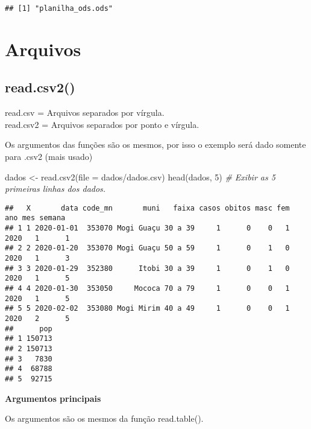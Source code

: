 \documentclass[
]{book}
\newenvironment{Shaded}{\begin{snugshade}}{\end{snugshade}}
\newcommand{\AttributeTok}[1]{\textcolor[rgb]{0.77,0.63,0.00}{#1}}
\newcommand{\CommentTok}[1]{\textcolor[rgb]{0.56,0.35,0.01}{\textit{#1}}}
\newcommand{\DecValTok}[1]{\textcolor[rgb]{0.00,0.00,0.81}{#1}}
\newcommand{\FunctionTok}[1]{\textcolor[rgb]{0.00,0.00,0.00}{#1}}
\newcommand{\NormalTok}[1]{#1}
\newcommand{\OtherTok}[1]{\textcolor[rgb]{0.56,0.35,0.01}{#1}}
\newcommand{\StringTok}[1]{\textcolor[rgb]{0.31,0.60,0.02}{#1}}
\theoremstyle{definition}
\theoremstyle{definition}
\theoremstyle{definition}
\theoremstyle{definition}
\theoremstyle{remark}
\begin{document}
\begin{verbatim}
## [1] "planilha_ods.ods"
\end{verbatim}

\hypertarget{arquivos}{%
\section{Arquivos}\label{arquivos}}

\hypertarget{read.csv2}{%
\subsection{read.csv2()}\label{read.csv2}}

read.csv = Arquivos separados por vírgula.\\
read.csv2 = Arquivos separados por ponto e vírgula.

Os argumentos das funções são os mesmos, por isso o exemplo será dado somente para .csv2 (mais usado)

\begin{Shaded}
\begin{Highlighting}[]
\NormalTok{dados }\OtherTok{\textless{}{-}} \FunctionTok{read.csv2}\NormalTok{(}\AttributeTok{file =} \StringTok{\textquotesingle{}dados/dados.csv\textquotesingle{}}\NormalTok{)}
\FunctionTok{head}\NormalTok{(dados, }\DecValTok{5}\NormalTok{)          }\CommentTok{\# Exibir as 5 primeiras linhas dos dados.}
\end{Highlighting}
\end{Shaded}

\begin{verbatim}
##   X       data code_mn       muni   faixa casos obitos masc fem  ano mes semana
## 1 1 2020-01-01  353070 Mogi Guaçu 30 a 39     1      0    0   1 2020   1      1
## 2 2 2020-01-20  353070 Mogi Guaçu 50 a 59     1      0    1   0 2020   1      3
## 3 3 2020-01-29  352380      Itobi 30 a 39     1      0    1   0 2020   1      5
## 4 4 2020-01-30  353050     Mococa 70 a 79     1      0    0   1 2020   1      5
## 5 5 2020-02-02  353080 Mogi Mirim 40 a 49     1      0    0   1 2020   2      5
##      pop
## 1 150713
## 2 150713
## 3   7830
## 4  68788
## 5  92715
\end{verbatim}

\textbf{Argumentos principais}

Os argumentos são os mesmos da função read.table().
\end{document}
